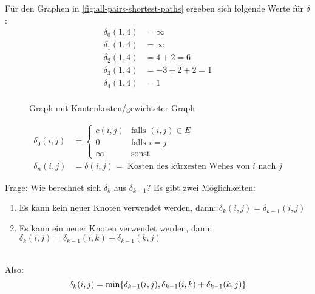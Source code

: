             Für den Graphen in \autoref{fig:all-pairs-shortest-paths} ergeben sich folgende Werte für $\delta$:
            \begin{align*}
                \delta_0(1,4) &= \infty \\
                \delta_1(1,4) &= \infty \\
                \delta_2(1,4) &= 4 + 2 = 6 \\
                \delta_3(1,4) &= -3 + 2 + 2 = 1  \\
                \delta_4(1,4) &= 1 \\
            \end{align*}

            \begin{figure}[htp]
                \centering
                \capstart
                
                \caption{Graph mit Kantenkosten/gewichteter Graph}
                \label{fig:all-pairs-shortest-paths}
            \end{figure}

            \begin{align*}
                \delta_0(i,j) &= \begin{cases}
                    c(i, j) & \text{falls } (i, j) \in E \\
                    0 & \text{falls } i = j \\
                    \infty & \text{sonst}
                \end{cases} \\
                \delta_n(i,j) &= \delta(i,j) = \text{ Kosten des kürzesten Wehes von $i$ nach $j$}
            \end{align*}

            Frage: Wie berechnet sich $\delta_k$ aus $\delta_{k-1}$? Es gibt zwei Möglichkeiten:
            \begin{enumerate}
                \item Es kann kein neuer Knoten verwendet werden, dann: $\delta_k(i,j) = \delta_{k-1}(i, j)$
                \item Es kann ein neuer Knoten verwendet werden, dann: $\delta_k(i,j) = \delta_{k-1}(i, k) + \delta_{k-1}(k, j)$
            \end{enumerate}
            \\
            Also:
            $$
                \delta_k(i, j) = \min\{\delta_{k-1}(i,j), \delta_{k-1}(i, k) + \delta_{k-1}(k, j)\}
            $$

